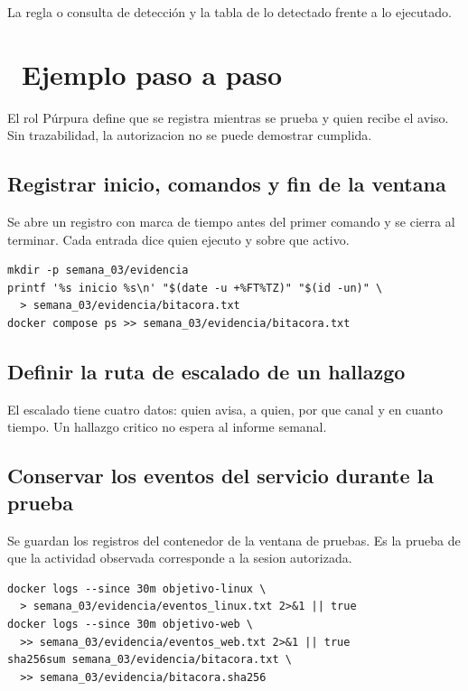 \documentclass[11pt,a4paper]{article}
\newcommand{\iconotexto}[2]{\textcolor{cyanNeon}{\faIcon{#1}}~#2}
\begin{document}
La regla o consulta de detección y la tabla de lo detectado frente a lo ejecutado.

\section{\iconotexto{list-ol}{Ejemplo paso a paso}}

El rol Púrpura define que se registra mientras se prueba y quien recibe el aviso. Sin trazabilidad, la autorizacion no se puede demostrar cumplida.

\subsection{Registrar inicio, comandos y fin de la ventana}

Se abre un registro con marca de tiempo antes del primer comando y se cierra al terminar. Cada entrada dice quien ejecuto y sobre que activo.

\begin{lstlisting}[style=estiloCodigo]
mkdir -p semana_03/evidencia
printf '%s inicio %s\n' "$(date -u +%FT%TZ)" "$(id -un)" \
  > semana_03/evidencia/bitacora.txt
docker compose ps >> semana_03/evidencia/bitacora.txt
\end{lstlisting}

\subsection{Definir la ruta de escalado de un hallazgo}

El escalado tiene cuatro datos: quien avisa, a quien, por que canal y en cuanto tiempo. Un hallazgo critico no espera al informe semanal.

\subsection{Conservar los eventos del servicio durante la prueba}

Se guardan los registros del contenedor de la ventana de pruebas. Es la prueba de que la actividad observada corresponde a la sesion autorizada.

\begin{lstlisting}[style=estiloCodigo]
docker logs --since 30m objetivo-linux \
  > semana_03/evidencia/eventos_linux.txt 2>&1 || true
docker logs --since 30m objetivo-web \
  >> semana_03/evidencia/eventos_web.txt 2>&1 || true
sha256sum semana_03/evidencia/bitacora.txt \
  >> semana_03/evidencia/bitacora.sha256
\end{lstlisting}
\end{document}

